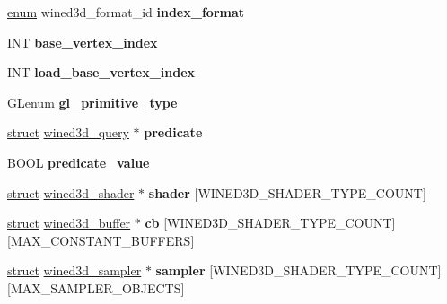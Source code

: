 \begin{DoxyCompactItemize}
\hyperlink{interfaceenum}{enum} wined3d\+\_\+format\+\_\+id {\bfseries index\+\_\+format}
\item 
\mbox{\label{structwined3d__state_a101a159412d605d6fac371464e688e85}} 
I\+NT {\bfseries base\+\_\+vertex\+\_\+index}
\item 
\mbox{\label{structwined3d__state_af287f89d22f8f4954eb5710e16262aa1}} 
I\+NT {\bfseries load\+\_\+base\+\_\+vertex\+\_\+index}
\item 
\mbox{\label{structwined3d__state_a6b8c3644b7f69ef84a3f911a9ace8fe0}} 
\hyperlink{interfacevoid}{G\+Lenum} {\bfseries gl\+\_\+primitive\+\_\+type}
\item 
\mbox{\label{structwined3d__state_abc89d87b6f00e62cb81569f36d9e13be}} 
\hyperlink{interfacestruct}{struct} \hyperlink{structwined3d__query}{wined3d\+\_\+query} $\ast$ {\bfseries predicate}
\item 
\mbox{\label{structwined3d__state_a22cab6ee51bfc9a38a71b81ff1d82646}} 
B\+O\+OL {\bfseries predicate\+\_\+value}
\item 
\mbox{\label{structwined3d__state_aa42063edbdbfa44413d55df4868d97ad}} 
\hyperlink{interfacestruct}{struct} \hyperlink{structwined3d__shader}{wined3d\+\_\+shader} $\ast$ {\bfseries shader} \mbox{[}W\+I\+N\+E\+D3\+D\+\_\+\+S\+H\+A\+D\+E\+R\+\_\+\+T\+Y\+P\+E\+\_\+\+C\+O\+U\+NT\mbox{]}
\item 
\mbox{\label{structwined3d__state_a9bd8f35abbf1bdc5f4d64494c35061cb}} 
\hyperlink{interfacestruct}{struct} \hyperlink{structwined3d__buffer}{wined3d\+\_\+buffer} $\ast$ {\bfseries cb} \mbox{[}W\+I\+N\+E\+D3\+D\+\_\+\+S\+H\+A\+D\+E\+R\+\_\+\+T\+Y\+P\+E\+\_\+\+C\+O\+U\+NT\mbox{]}\mbox{[}M\+A\+X\+\_\+\+C\+O\+N\+S\+T\+A\+N\+T\+\_\+\+B\+U\+F\+F\+E\+RS\mbox{]}
\item 
\mbox{\label{structwined3d__state_ae1d4119c8f95458d6592fb19146fabe1}} 
\hyperlink{interfacestruct}{struct} \hyperlink{structwined3d__sampler}{wined3d\+\_\+sampler} $\ast$ {\bfseries sampler} \mbox{[}W\+I\+N\+E\+D3\+D\+\_\+\+S\+H\+A\+D\+E\+R\+\_\+\+T\+Y\+P\+E\+\_\+\+C\+O\+U\+NT\mbox{]}\mbox{[}M\+A\+X\+\_\+\+S\+A\+M\+P\+L\+E\+R\+\_\+\+O\+B\+J\+E\+C\+TS\mbox{]}

\end{DoxyCompactItemize}
